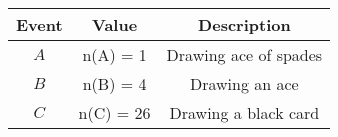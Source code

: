
\begin{center}
\begin{tabular}{|c|c|c|}
\hline
\textbf{Event}& \textbf{Value} & \textbf{Description} \\ \hline
$A$		   	&   n(A) = 1      & Drawing ace of spades         \\ \hline
$B$ 		&	n(B) = 4      & Drawing an ace         \\ \hline
$C$ 		&	n(C) = 26      & Drawing a black card         \\ \hline
\end{tabular}
\end{center}
